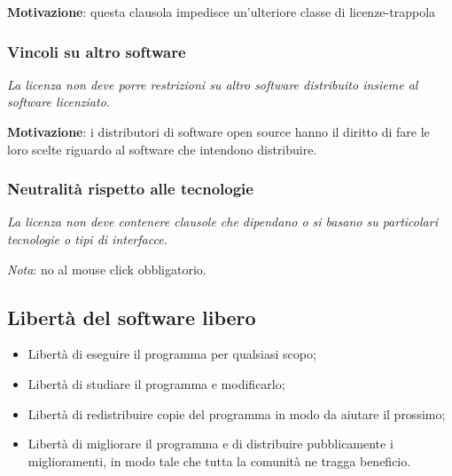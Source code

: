 \textbf{Motivazione}: questa clausola impedisce un'ulteriore classe di licenze-trappola

\subsubsection{Vincoli su altro software}

\begin{center}

\textit{La licenza non deve porre restrizioni su altro software distribuito insieme al software licenziato.}

\end{center}

\textbf{Motivazione}: i distributori di software open source hanno il diritto di fare le loro scelte riguardo al software che intendono distribuire.

\subsubsection{Neutralità rispetto alle tecnologie}

\begin{center}

\textit{La licenza non deve contenere clausole che dipendano o si basano su particolari tecnologie o tipi di interfacce.}

\end{center}

\textit{Nota}: no al mouse click obbligatorio.

\subsection{Libertà del software libero}

\begin{itemize}

\item Libertà di eseguire il programma per qualsiasi scopo;
\item Libertà di studiare il programma e modificarlo;
\item Libertà di redistribuire copie del programma in modo da aiutare il prossimo;
\item Libertà di migliorare il programma e di distribuire pubblicamente i miglioramenti, in modo tale che tutta la comunità ne tragga beneficio.

\end{itemize}